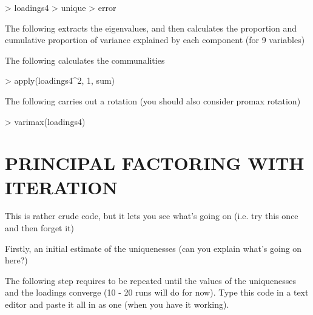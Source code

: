 \begin{Schunk}
\begin{Sinput}
> loadings4
> unique
> error
\end{Sinput}
\end{Schunk}

The following extracts the eigenvalues, and then calculates the proportion and cumulative proportion of variance explained by each component (for 9 variables)


\begin{Schunk}
\end{Schunk}

The following calculates the communalities

\begin{Schunk}
\begin{Sinput}
> apply(loadings4^2, 1, sum)
\end{Sinput}
\end{Schunk}

The following carries out a rotation (you should also consider promax rotation)

\begin{Schunk}
\begin{Sinput}
> varimax(loadings4)
\end{Sinput}
\end{Schunk}

\section{PRINCIPAL FACTORING WITH ITERATION}

This is rather crude code, but it lets you see what's going on (i.e. try this once and then forget it)

Firstly, an initial estimate of the uniquenesses (can you explain what's going on here?)


\begin{Schunk}
\end{Schunk}


The following step requires to be repeated until the values of the uniquenesses and the loadings converge (10 - 20 runs will do for now).   Type this code in a text editor and paste it all in as one (when you have it working).


